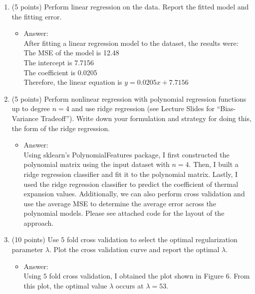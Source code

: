 \documentclass[twoside,12pt]{article}
\begin{document}
\begin{enumerate}
\begin{enumerate}

\item (5 points) Perform linear regression on the data. Report the fitted model and the fitting error.
\begin{itemize}
\item Answer:\\
After fitting a linear regression model to the dataset, the results were:\\
The MSE of the model is 12.48\\
The intercept is 7.7156\\
The coefficient is 0.0205\\
Therefore, the linear equation is $y = 0.0205x + 7.7156$

\end{itemize}
\item (5 points) Perform nonlinear regression with polynomial regression functions up to degree $n = 4$ and use ridge regression (see Lecture Slides for ``Bias-Variance Tradeoff''). Write down your formulation and strategy for doing this, the form of the ridge regression. 
\begin{itemize}
\item Answer:\\
Using sklearn's PolynomialFeatures package, I first constructed the polynomial matrix using the input dataset with $n=4$. Then, I built a ridge regression classifier and fit it to the polynomial matrix. Lastly, I used the ridge regression classifier to predict the coefficient of thermal expansion values. Additionally, we can also perform cross validation and use the average MSE to determine the average error across the polynomial models. Please see attached code for the layout of the approach.
\end{itemize}

\item (10 points) Use $5$ fold cross validation to select the optimal regularization parameter $\lambda$. Plot the cross validation curve and report the optimal $\lambda$.

\begin{itemize}
\item Answer:\\
Using $5$ fold cross validation, I obtained the plot shown in Figure 6. From this plot, the optimal value $\lambda$ occurs at $\lambda = 53$.


\end{itemize}
\end{enumerate}
\end{enumerate}
\end{document}

